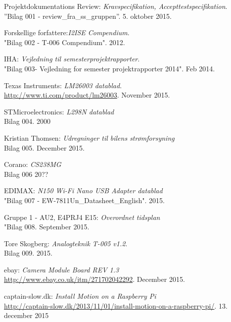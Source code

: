	\fancyhead[CE,CO]{}
\renewcommand{\bibname}{Litteraturliste}
\begin{thebibliography}{2}

 Projektdokumentations Review: \textit{Kravspecifikation, Accepttestspecifikation}.\\
''Bilag 001 - review\_fra\_ss\_gruppen''. 5. oktober 2015.

 Forskellige forfattere:\textit{I2ISE Compendium}. \\
"Bilag 002 - T-006 Compendium". 2012.

 IHA: \textit{Vejledning til semesterprojektrapporter}. \\
"Bilag 003- Vejledning for semester projektrapporter 2014". Feb 2014.

 Texas Instruments: \textit{LM26003 datablad}. \\
\url{http://www.ti.com/product/lm26003}. November 2015.

 STMicroelectronics: \textit{L298N datablad} \\
Bilag 004. 2000

 Kristian Thomsen: \textit{Udregninger til bilens strømforsyning} \\
Bilag 005. December 2015.

 Corano: \textit{CS238MG}\\
Bilag 006 20??

 EDIMAX: \textit{N150 Wi-Fi Nano USB Adapter datablad} \\
"Bilag 007 - EW-7811Un\_Datasheet\_English". 2015.

 Gruppe 1 - AU2, E4PRJ4 E15: \textit{Overordnet tidsplan} \\
"Bilag 008. September 2015.

 Tore Skogberg: \textit{Analogteknik T-005 v1.2}.\\
Bilag 009. 2015.

 ebay: \textit{Camera Module Board REV 1.3} \\
\url{http://www.ebay.co.uk/itm/271702042292}. December 2015.

captain-slow.dk: \textit{Install Motion on a Raspberry Pi} \\
\url{http://captain-slow.dk/2013/11/01/install-motion-on-a-raspberry-pi/}. 13. december 2015


\end{thebibliography}
